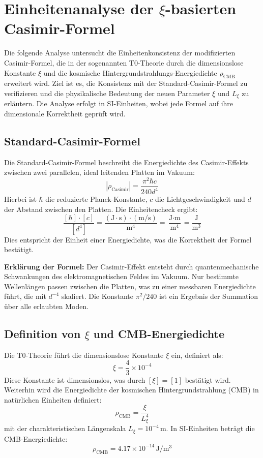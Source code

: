 \documentclass{article}
\begin{document}
	
	\section{Einheitenanalyse der $\xi$-basierten Casimir-Formel}
	Die folgende Analyse untersucht die Einheitenkonsistenz der modifizierten Casimir-Formel, die in der sogenannten T0-Theorie durch die dimensionslose Konstante $\xi$ und die kosmische Hintergrundstrahlungs-Energiedichte $\rho_{\text{CMB}}$ erweitert wird. Ziel ist es, die Konsistenz mit der Standard-Casimir-Formel zu verifizieren und die physikalische Bedeutung der neuen Parameter $\xi$ und $L_\xi$ zu erläutern. Die Analyse erfolgt in SI-Einheiten, wobei jede Formel auf ihre dimensionale Korrektheit geprüft wird.
	
	\subsection{Standard-Casimir-Formel}
	Die Standard-Casimir-Formel beschreibt die Energiedichte des Casimir-Effekts zwischen zwei parallelen, ideal leitenden Platten im Vakuum:
	\begin{equation}
		|\rho_{\text{Casimir}}| = \frac{\pi^2 \hbar c}{240 d^4}
	\end{equation}
	Hierbei ist $\hbar$ die reduzierte Planck-Konstante, $c$ die Lichtgeschwindigkeit und $d$ der Abstand zwischen den Platten. Die Einheitencheck ergibt:
	\begin{equation}
		\frac{[\hbar] \cdot [c]}{[d^4]} = \frac{(\text{J} \cdot \text{s}) \cdot (\text{m}/\text{s})}{\text{m}^4} = \frac{\text{J} \cdot \text{m}}{\text{m}^4} = \frac{\text{J}}{\text{m}^3}
	\end{equation}
	Dies entspricht der Einheit einer Energiedichte, was die Korrektheit der Formel bestätigt.
	
	\textbf{Erklärung der Formel:} Der Casimir-Effekt entsteht durch quantenmechanische Schwankungen des elektromagnetischen Feldes im Vakuum. Nur bestimmte Wellenlängen passen zwischen die Platten, was zu einer messbaren Energiedichte führt, die mit $d^{-4}$ skaliert. Die Konstante $\pi^2/240$ ist ein Ergebnis der Summation über alle erlaubten Moden.
	
	\subsection{Definition von $\xi$ und CMB-Energiedichte}
	Die T0-Theorie führt die dimensionslose Konstante $\xi$ ein, definiert als:
	\begin{equation}
		\xi = \frac{4}{3} \times 10^{-4}
	\end{equation}
	Diese Konstante ist dimensionslos, was durch $[ \xi ] = [1]$ bestätigt wird. Weiterhin wird die Energiedichte der kosmischen Hintergrundstrahlung (CMB) in natürlichen Einheiten definiert:
	\begin{equation}
		\rho_{\text{CMB}} = \frac{\xi}{L_\xi^4}
	\end{equation}
	mit der charakteristischen Längenskala $L_\xi = 10^{-4} \, \text{m}$. In SI-Einheiten beträgt die CMB-Energiedichte:
	\begin{equation}
		\rho_{\text{CMB}} = 4.17 \times 10^{-14} \, \text{J}/\text{m}^3
	\end{equation}
	
\end{document}
